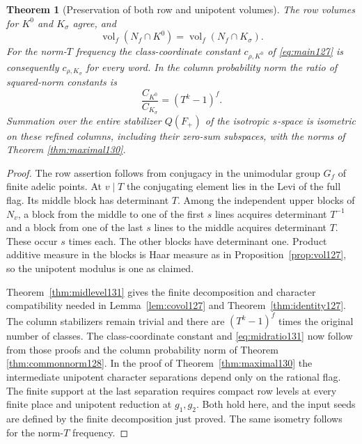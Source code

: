\documentclass[a4paper,11pt]{article}
\newtheorem{theorem}[proposition]{Theorem}
\theoremstyle{definition}
\theoremstyle{remark}
\numberwithin{equation}{section}
\begin{document}
\begin{theorem}[Preservation of both row and unipotent volumes]
\label{thm:midnorm131}
The row volumes for \(K^0\) and \(K_\sigma\) agree, and
\[
       \operatorname{vol}_f(N_f\cap K^0)
                    =\operatorname{vol}_f(N_f\cap K_\sigma).
\]
For the norm-\(T\) frequency the class-coordinate constant
\(c_{\rho,K^0}\) of \eqref{eq:main127} is consequently
\(c_{\rho,K_\sigma}\) for every word. In the column probability
norm the ratio of squared-norm constants is
\begin{equation}
                \frac{C_{K^0}}{C_{K_\sigma}}=(T^k-1)^f .
                \label{eq:midratio131}
\end{equation}
Summation over the entire stabilizer \(Q(F_+)\) of the isotropic
\(s\)-space is isometric on these refined columns, including
their zero-sum subspaces, with the norms of Theorem \ref{thm:maximal130}.
\end{theorem}
\begin{proof}
The row assertion follows from conjugacy in the unimodular
group \(G_f\) of finite adelic points. At \(v\mid T\) the
conjugating element lies in the Levi of the full flag. Its
middle block has determinant \(T\). Among the independent
upper blocks of \(N_v\), a block from the middle to one of
the first \(s\) lines acquires determinant \(T^{-1}\) and
a block from one of the last \(s\) lines to the middle acquires
determinant \(T\). These occur \(s\) times each. The other
blocks have determinant one. Product additive measure in the
blocks is Haar measure as in Proposition~\ref{prop:vol127},
so the unipotent modulus is one as claimed.

Theorem~\ref{thm:midlevel131} gives the finite decomposition and
character compatibility needed in Lemma~\ref{lem:covol127} and
Theorem~\ref{thm:identity127}. The column stabilizers remain
trivial and there are \((T^k-1)^f\) times the original number
of classes. The class-coordinate constant and \eqref{eq:midratio131}
now follow from those proofs and the column probability norm of
Theorem \ref{thm:commonnorm128}.
In the proof of Theorem~\ref{thm:maximal130} the intermediate
unipotent character separations depend only on the rational flag.
The finite support at the last separation requires compact row
levels at every finite place and unipotent reduction at \(g_1,g_2\).
Both hold here, and the input seeds are defined by the finite
decomposition just proved. The same isometry follows for the
norm-\(T\) frequency.
\end{proof}
\end{document}

